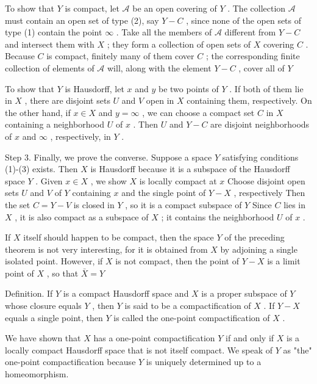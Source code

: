 To show that \(Y\) is compact, let \(\mathcal{A}\) be an open covering of \(Y\) . The collection \(\mathcal{A}\) must contain an open set of type (2), say \(Y - C\) , since none of the open sets of type (1) contain the point \(\infty\) . Take all the members of \(\mathcal{A}\) different from \(Y - C\) and intersect them with \(X\) ; they form a collection of open sets of \(X\) covering \(C\) . Because \(C\) is compact, finitely many of them cover \(C\) ; the corresponding finite collection of elements of \(\mathcal{A}\) will, along with the element \(Y - C\) , cover all of \(Y\)

To show that \(Y\) is Hausdorff, let \(x\) and \(y\) be two points of \(Y\) . If both of them lie in \(X\) , there are disjoint sets \(U\) and \(V\) open in \(X\) containing them, respectively. On the other hand, if \(x \in  X\) and \(y = \infty\) , we can choose a compact set \(C\) in \(X\) containing a neighborhood \(U\) of \(x\) . Then \(U\) and \(Y - C\) are disjoint neighborhoods of \(x\) and \(\infty\) , respectively, in \(Y\) .

Step 3. Finally, we prove the converse. Suppose a space \(Y\) satisfying conditions (1)-(3) exists. Then \(X\) is Hausdorff because it is a subspace of the Hausdorff space \(Y\) . Given \(x \in  X\) , we show \(X\) is locally compact at \(x\) Choose disjoint open sets \(U\) and \(V\) of \(Y\) containing \(x\) and the single point of \(Y - X\) , respectively Then the set \(C = Y - V\) is closed in \(Y\) , so it is a compact subspace of \(Y\) Since \(C\) lies in \(X\) , it is also compact as a subspace of \(X\) ; it contains the neighborhood \(U\) of \(x\) .

If \(X\) itself should happen to be compact, then the space \(Y\) of the preceding theorem is not very interesting, for it is obtained from \(X\) by adjoining a single isolated point. However, if \(X\) is not compact, then the point of \(Y - X\) is a limit point of \(X\) , so that \(\bar{X} = Y\)

Definition. If \(Y\) is a compact Hausdorff space and \(X\) is a proper subspace of \(Y\) whose closure equals \(Y\) , then \(Y\) is said to be a compactification of \(X\) . If \(Y - X\) equals a single point, then \(Y\) is called the one-point compactification of \(X\) .

We have shown that \(X\) has a one-point compactification \(Y\) if and only if \(X\) is a locally compact Hausdorff space that is not itself compact. We speak of \(Y\) as "the" one-point compactification because \(Y\) is uniquely determined up to a homeomorphism.

